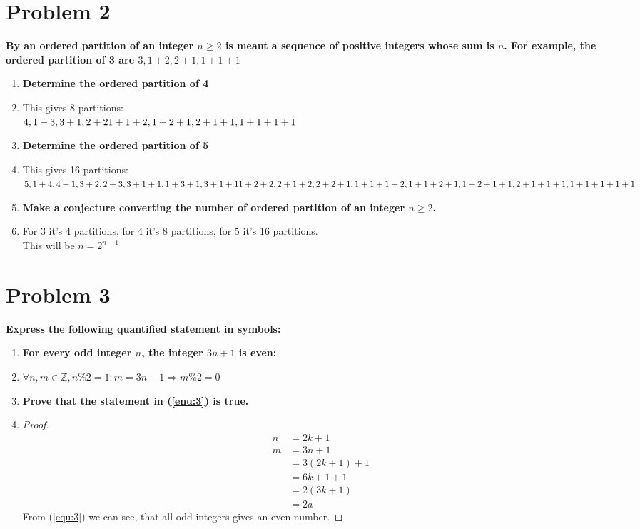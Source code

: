 \documentclass[english,11pt,a4paper]{article}
\begin{document}
\section*{Problem 2}
\textbf{By an ordered partition of an integer $n \geq 2$ is meant a sequence of positive integers whose sum is $n$. For example, the ordered partition of 3 are $3,1+2,2+1,1+1+1$}
\begin{enumerate}[a]
\item \textbf{Determine the ordered partition of 4}
\item[] This gives 8 partitions:\\
$4, \\
1+3, 3+1, \\
2+2\\
1+1+2, 1+2+1, 2+1+1, \\
1+1+1+1$
\item \textbf{Determine the ordered partition of 5}
\item[] This gives 16 partitions: \\
$5, \\
1+4,4+1,\\
3+2,2+3,\\
3+1+1,1+3+1,3+1+1\\
1+2+2,2+1+2,2+2+1,\\
1+1+1+2,1+1+2+1,1+2+1+1,2+1+1+1,\\
1+1+1+1+1$
\item \textbf{Make a conjecture converting the number of ordered partition of an integer $n\geq 2$.}
\item[] For 3 it's 4 partitions, for 4 it's 8 partitions, for 5 it's 16 partitions.\\
This will be $n=2^{n-1}$
\end{enumerate}




\section*{Problem 3}
\textbf{Express the following quantified statement in symbols:}
\begin{enumerate}[a]
\item \textbf{\label{enu:3}For every odd integer $n$, the integer $3n+1$ is even:}
\item[]$\forall n, m \in \mathbb{Z}, n\%2 = 1: m = 3n+1 \Rightarrow m\%2=0$
\item \textbf{Prove that the statement in (\ref{enu:3}) is true.}
\item[] 
\begin{proof}

\begin{align}
n &= 2k+1\\
m &= 3n+1\\
	&=3(2k+1)+1\\
	&=6k+1+1\\
	&=2(3k+1)\\
	&=2a\label{equ:3}
\end{align}
From (\ref{equ:3}) we can see, that all odd integers gives an even number.
\end{proof}
\end{enumerate}
\end{document}
